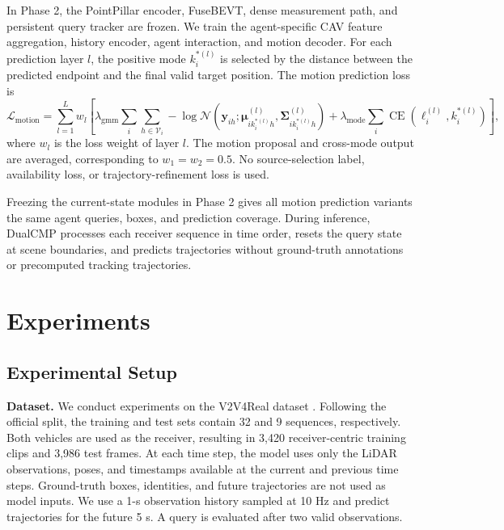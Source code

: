 \documentclass[lettersize,journal]{IEEEtran}
\begin{document}
In Phase 2, the PointPillar encoder, FuseBEVT, dense measurement path, and persistent query tracker are frozen. We train the agent-specific CAV feature aggregation, history encoder, agent interaction, and motion decoder. For each prediction layer \(l\), the positive mode \(k_i^{*(l)}\) is selected by the distance between the predicted endpoint and the final valid target position. The motion prediction loss is
\[
\mathcal{L}_{\mathrm{motion}}=
\sum_{l=1}^{L}w_l
\left[
\lambda_{\mathrm{gmm}}
\sum_{i}\sum_{h\in\mathcal{V}_i}
-\log\mathcal{N}
\left(
\mathbf{y}_{ih};
\boldsymbol{\mu}_{ik_i^{*(l)}h}^{(l)},
\boldsymbol{\Sigma}_{ik_i^{*(l)}h}^{(l)}
\right)
+\lambda_{\mathrm{mode}}
\sum_i\operatorname{CE}
\left(\boldsymbol{\ell}_i^{(l)},k_i^{*(l)}\right)
\right],
\tag{12}
\]
where \(w_l\) is the loss weight of layer \(l\). The motion proposal and cross-mode output are averaged, corresponding to \(w_1=w_2=0.5\). No source-selection label, availability loss, or trajectory-refinement loss is used.

Freezing the current-state modules in Phase 2 gives all motion prediction variants the same agent queries, boxes, and prediction coverage. During inference, DualCMP processes each receiver sequence in time order, resets the query state at scene boundaries, and predicts trajectories without ground-truth annotations or precomputed tracking trajectories.

\section{Experiments}

\subsection{Experimental Setup}

\textbf{Dataset.} We conduct experiments on the V2V4Real dataset \cite{xu2023v2v4real}. Following the official split, the training and test sets contain 32 and 9 sequences, respectively. Both vehicles are used as the receiver, resulting in 3,420 receiver-centric training clips and 3,986 test frames. At each time step, the model uses only the LiDAR observations, poses, and timestamps available at the current and previous time steps. Ground-truth boxes, identities, and future trajectories are not used as model inputs. We use a 1-s observation history sampled at 10 Hz and predict trajectories for the future 5 s. A query is evaluated after two valid observations.
\end{document}
